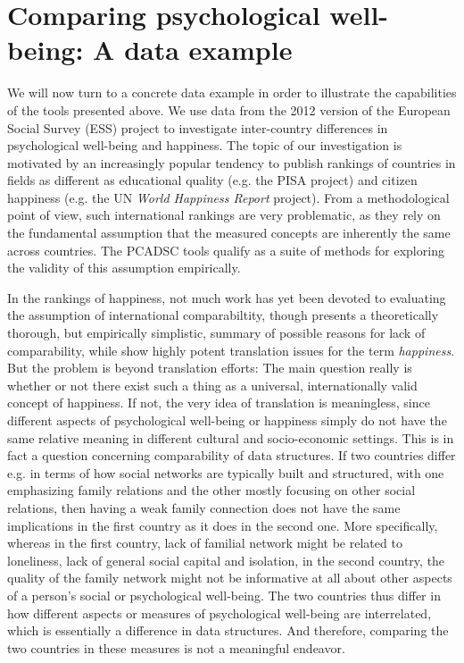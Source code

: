 \documentclass[titlepage,11pt,twoside]{article}
\begin{document}
\section{Comparing psychological well-being: A data example}
\label{sec:dataexample}
We will now turn to a concrete data example in order to illustrate the capabilities of the tools presented above. We use data from the 2012 version of the European Social Survey (ESS) project to investigate inter-country differences in psychological well-being and happiness. The topic of our investigation is motivated by an increasingly popular tendency to publish rankings of countries in fields as different as educational quality (e.g. the PISA project) and citizen happiness (e.g. the UN \textit{World Happiness Report} project). From a methodological point of view, such international rankings are very problematic, as they rely on the fundamental assumption that the measured concepts are inherently the same across countries. The PCADSC tools qualify as a suite of methods for exploring the validity of this assumption empirically. 

In the rankings of happiness, not much work has yet been devoted to evaluating the assumption of international comparabiltity, though \cite{Veenhoven2012} presents a theoretically thorough, but empirically simplistic, summary of possible reasons for lack of comparability, while \cite{Lolle2016} show highly potent translation issues for the term \textit{happiness}. But the problem is beyond translation efforts: The main question really is whether or not there exist such a thing as a universal, internationally valid concept of happiness. If not, the very idea of translation is meaningless, since different aspects of psychological well-being or happiness simply do not have the same relative meaning in different cultural and socio-economic settings. This is in fact a question concerning comparability of data structures. If two countries differ e.g. in terms of how social networks are typically built and structured, with one emphasizing family relations and the other mostly focusing on other social relations, then having a weak family connection does not have the same implications in the first country as it does in the second one. More specifically, whereas in the first country, lack of familial network might be related to loneliness, lack of general social capital and isolation, in the second country, the quality of the family network might not be informative at all about other aspects of a person's social or psychological well-being. The two countries thus differ in how different aspects or measures of psychological well-being are interrelated, which is essentially a difference in data structures. And therefore, comparing the two countries in these measures is not a meaningful endeavor. 
\end{document}

